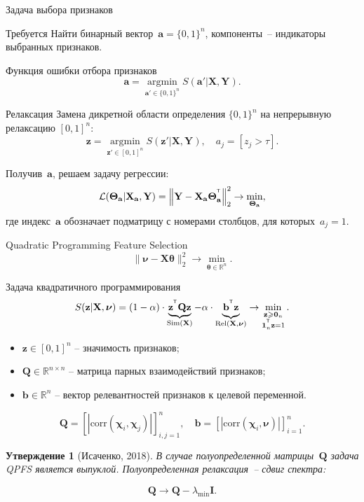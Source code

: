 \documentclass[9pt]{beamer}
\renewcommand{\geq}{\ensuremath{\geqslant}}
\newcommand{\ba}{\mathbf{a}}
\newcommand{\bb}{\mathbf{b}}
\newcommand{\bz}{\mathbf{z}}
\newcommand{\bQ}{\mathbf{Q}}
\newcommand{\bX}{\mathbf{X}}
\newcommand{\bY}{\mathbf{Y}}
\newcommand{\bbR}{\mathbb{R}}
\newcommand{\bchi}{\boldsymbol{\chi}}
\newcommand{\bnu}{\boldsymbol{\nu}}
\newcommand{\btheta}{\boldsymbol{\theta}}
\newcommand{\bTheta}{\boldsymbol{\Theta}}
\newcommand{\T}{^{\text{\tiny\sffamily\upshape\mdseries T}}}
\newcommand{\bOne}{\boldsymbol{1}}
\newcommand{\bZero}{\boldsymbol{0}}
\newcommand{\argmin}{\mathop{\arg \min}\limits}
\newtheorem{statement}{Утверждение}
\begin{document}
\begin{frame}{Задача выбора признаков}
\begin{block}{Требуется}
Найти бинарный вектор~$\ba = \{0, 1\}^n$, компоненты~-- индикаторы выбранных признаков. 
\end{block}
\begin{block}{Функция ошибки отбора признаков}
	\vspace{-0.2cm}
\[
\ba = \argmin_{\ba' \in \{0, 1\}^n} S(\ba' | \bX, \bY).
\]
\vspace{-0.5cm}
\end{block}
\begin{block}{Релаксация}
	Замена дикретной области определения $\{0, 1\}^n$ на непрерывную релаксацию $[0, 1]^n$:
	\[
	\bz = \argmin_{\bz' \in [0, 1]^n} S(\bz' | \bX, \bY), \quad 
	a_j = [z_j > \tau].
\]
\end{block}
Получив~$\ba$, решаем задачу регрессии:
\[
\mathcal{L}(\bTheta_{\ba} | \bX_{\ba}, \bY) = {\left\| \mathbf{Y} - \bX_{\ba}\bTheta^{\T}_{\ba} \right\| }_2^2 \rightarrow\min_{\bTheta_{\ba}},
\]
где индекс~$\ba$ обозначает подматрицу с номерами столбцов, для которых~$a_j = 1$.
\end{frame}
\begin{frame}{Quadratic Programming Feature Selection}
	\[
	\| \bnu - \bX \btheta\|_2^2 \rightarrow\min_{\btheta \in \bbR^{n}}.
	\]
	\vspace{-0.3cm}
	\begin{block}{Задача квадратичного программирования}
	\vspace{-0.3cm}
	\[
	S(\bz | \bX, \bnu)	= (1 - \alpha) \cdot \underbrace{\bz^{\T} \bQ \bz}_{\text{Sim}(\bX)} - \alpha \cdot \underbrace{\vphantom{()} \mathbf{b}^{\T} \bz}_{\text{Rel}(\bX, \bnu)} \rightarrow \min_{\substack{\bz \geq \bZero_n \\ \bOne_n^{\T} \bz=1}}.
	\]
	\end{block}
		\begin{itemize}
			\item $\bz \in [0, 1]^n$ -- значимость признаков;
			\item $\bQ \in \bbR^{n \times n}$ -- матрица парных взаимодействий признаков;
			\item $\mathbf{b} \in \bbR^n$ -- вектор релевантностей признаков к целевой переменной.
		\end{itemize}
		\[
		\bQ = \left[\left|\text{corr}(\bchi_i, \bchi_j)\right|\right]_{i,j=1}^n, \quad
		\bb = \left[\left|\text{corr}(\bchi_i, \bnu)\right|\right]_{i=1}^n.
		\]
\vspace{-0.2cm}
\begin{statement}[Исаченко, 2018]
	В случае полуопределенной матрицы~$\bQ$ задача QPFS является выпуклой. 
	Полуопределенная релаксация~-- сдвиг спектра:
\end{statement}
\begin{equation*}
\bQ \rightarrow \bQ - \lambda_{\min} \mathbf{I}.
\end{equation*}
\end{frame}
\end{document}
